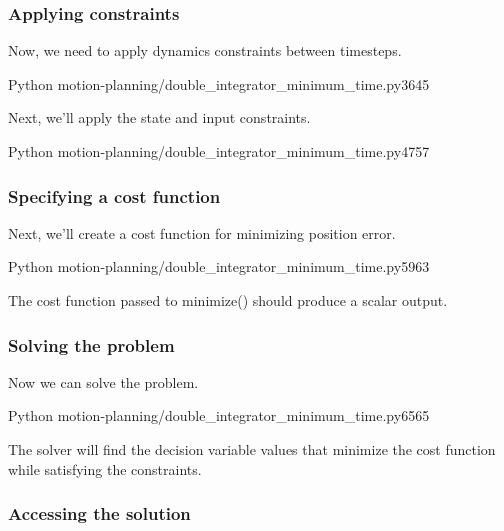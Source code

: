 \subsubsection{Applying constraints}

Now, we need to apply dynamics constraints between timesteps.
\begin{coderemotesubset}{Python}
  {motion-planning/double_integrator_minimum_time.py}{36}{45}
\end{coderemotesubset}

Next, we'll apply the state and input constraints.
\begin{coderemotesubset}{Python}
  {motion-planning/double_integrator_minimum_time.py}{47}{57}
\end{coderemotesubset}

\subsubsection{Specifying a cost function}

Next, we'll create a cost function for minimizing position error.
\begin{coderemotesubset}{Python}
  {motion-planning/double_integrator_minimum_time.py}{59}{63}
\end{coderemotesubset}

The cost function passed to minimize() should produce a scalar output.

\subsubsection{Solving the problem}

Now we can solve the problem.
\begin{coderemotesubset}{Python}
  {motion-planning/double_integrator_minimum_time.py}{65}{65}
\end{coderemotesubset}

The solver will find the decision variable values that minimize the cost
function while satisfying the constraints.

\subsubsection{Accessing the solution}


